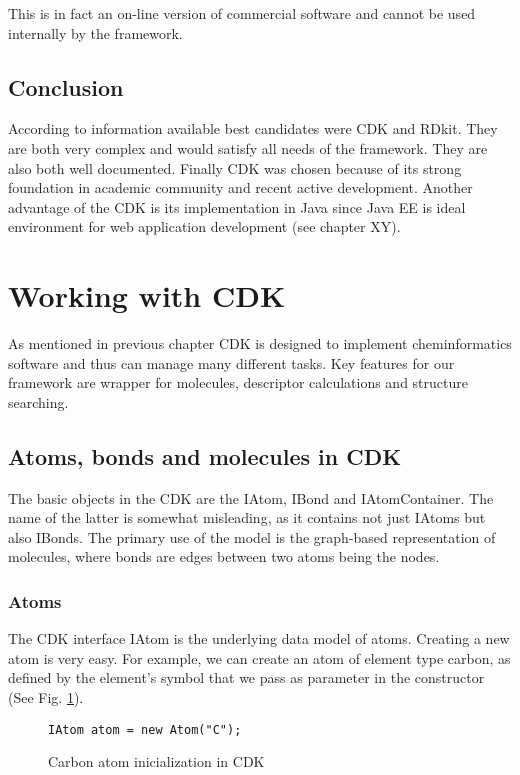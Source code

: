 \documentclass[thesis=M,english]{FITthesis}[2012/10/20]
\begin{document}
This is in fact an on-line version of commercial software and cannot be used internally by the framework.

\subsection{Conclusion}
According to information available best candidates were CDK and RDkit. They are both very complex and would satisfy all needs of the framework. They are also both well documented. Finally CDK was chosen because of its strong foundation in academic community and recent active development. Another advantage of the CDK is its implementation in Java since Java EE is ideal environment for web application development (see chapter XY).


\section{Working with CDK}
As mentioned in previous chapter CDK is designed to implement cheminformatics software and thus can manage many different tasks. Key features for our framework are wrapper for molecules, descriptor calculations and structure searching.

\subsection{Atoms, bonds and molecules in CDK}
The basic objects in the CDK are the IAtom, IBond and IAtomContainer. The name of the latter is somewhat misleading, as it contains not just IAtoms but also IBonds. The primary use of the model is the graph-based representation of molecules, where bonds are edges between two atoms being the nodes.\cite{cdk}

\subsubsection{Atoms}
The CDK interface IAtom is the underlying data model of atoms. Creating a new atom is very easy. For example, we can create an atom of element type carbon, as defined by the element's symbol that we pass as parameter in the constructor (See Fig. \ref{cdkAtomCode}).

\begin{figure}
\begin{lstlisting}
IAtom atom = new Atom("C");
\end{lstlisting}
\caption{Carbon atom inicialization in CDK}
\label{cdkAtomCode}
\end{figure}
\end{document}

